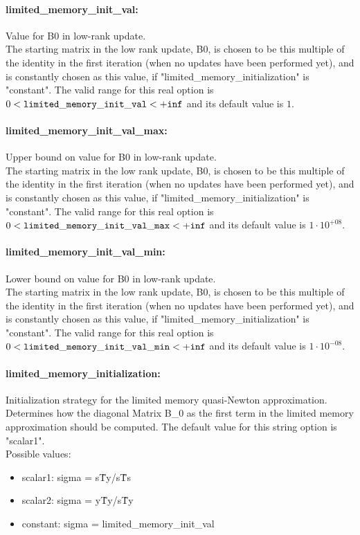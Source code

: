 \paragraph{limited\_memory\_init\_val:}\label{sec:limited_memory_init_val} Value for B0 in low-rank update. $\;$ \\
 The starting matrix in the low rank update, B0,
is chosen to be this multiple of the identity in
the first iteration (when no updates have been
performed yet), and is constantly chosen as this
value, if "limited\_memory\_initialization" is
"constant". The valid range for this real option is 
$0 <  {\tt limited\_memory\_init\_val } <  {\tt +inf}$
and its default value is $1$.


\paragraph{limited\_memory\_init\_val\_max:}\label{sec:limited_memory_init_val_max} Upper bound on value for B0 in low-rank update. $\;$ \\
 The starting matrix in the low rank update, B0,
is chosen to be this multiple of the identity in
the first iteration (when no updates have been
performed yet), and is constantly chosen as this
value, if "limited\_memory\_initialization" is
"constant". The valid range for this real option is 
$0 <  {\tt limited\_memory\_init\_val\_max } <  {\tt +inf}$
and its default value is $1 \cdot 10^{+08}$.


\paragraph{limited\_memory\_init\_val\_min:}\label{sec:limited_memory_init_val_min} Lower bound on value for B0 in low-rank update. $\;$ \\
 The starting matrix in the low rank update, B0,
is chosen to be this multiple of the identity in
the first iteration (when no updates have been
performed yet), and is constantly chosen as this
value, if "limited\_memory\_initialization" is
"constant". The valid range for this real option is 
$0 <  {\tt limited\_memory\_init\_val\_min } <  {\tt +inf}$
and its default value is $1 \cdot 10^{-08}$.


\paragraph{limited\_memory\_initialization:}\label{sec:limited_memory_initialization} Initialization strategy for the limited memory quasi-Newton approximation. $\;$ \\
 Determines how the diagonal Matrix B\_0 as the
first term in the limited memory approximation
should be computed.
The default value for this string option is "scalar1".
\\ 
Possible values:
\begin{itemize}
   \item scalar1: sigma = s\^Ty/s\^Ts
   \item scalar2: sigma = y\^Ty/s\^Ty
   \item constant: sigma = limited\_memory\_init\_val
\end{itemize}

